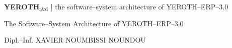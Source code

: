 \documentclass[a4paper, 10pt]{article}
\newcommand{\yerothrd}{\textcolor{yerothColorGreen}
			{\textsc{\textcolor{yerothColorRed}{YEROTH}}$_{\text{r\&d}}$\xspace}}
\newcommand{\yerotherpblack}{YEROTH--ERP--$3.0$\xspace}
\newcommand{\myfullacademicname}{Dipl.--Inf. XAVIER NOUMBISSI NOUNDOU\xspace}
\begin{document}
\thispagestyle{OnlyFirstPage}

{\bf \Large \yerothrd} {| \sc \scriptsize the software--system architecture of \yerotherpblack}

\vspace{2.0em}

\begin{center}
{\LARGE The Software--System Architecture of \yerotherpblack}
\end{center}

\vspace{2.0em}

\begin{center}
{\large \myfullacademicname}
\end{center}

\vspace{2.0em}



\vspace{3em}

\begingroup
\tableofcontents
\endgroup

\begingroup
\color{medgreen}
\listoftables
\endgroup

\begingroup
\color{medgreen}
\listoffigures
\endgroup

\newpage
\end{document}

